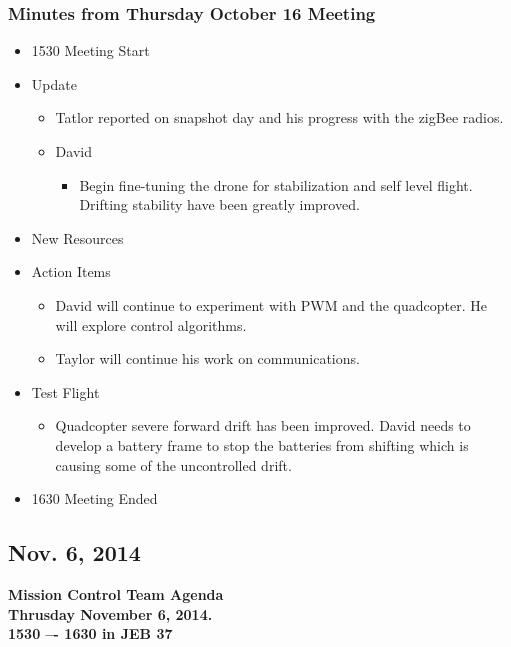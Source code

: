 \documentclass[pdftex,11pt]{article}
\begin{document}
\subsubsection[short]{Minutes from Thursday October 16 Meeting}
\begin{itemize}
	\item 1530 \indent Meeting Start
	\item Update
	\begin{itemize}
		\item  Tatlor reported on snapshot day and his progress with the zigBee radios.
		\item David
		\begin{itemize}
			\item Begin fine-tuning the drone for stabilization and self level flight.
	               Drifting stability have been greatly improved.
		\end{itemize}
	\end{itemize}
	\item New Resources
		\begin{itemize}

		\end{itemize}
	\item Action Items
	\begin{itemize}
		\item David will continue to experiment with PWM and the quadcopter.   He will explore control algorithms.
		\item Taylor will continue his work on communications.
	\end{itemize}
	\item Test Flight
	\begin{itemize}
		\item  Quadcopter severe forward drift has been improved. David needs to develop a battery frame to stop the batteries from shifting which is causing some of the uncontrolled drift.
	\end{itemize}
	\item 1630 \indent Meeting Ended
\end{itemize}	


\clearpage


\subsection{Nov. 6, 2014}
{ \huge \bfseries Mission Control Team Agenda \\[0.4cm] }
{ \huge \bfseries Thrusday November 6, 2014.\\1530 –-  1630  in JEB 37\\[0.4cm] }
\vspace*{2.5mm}
\end{document}
